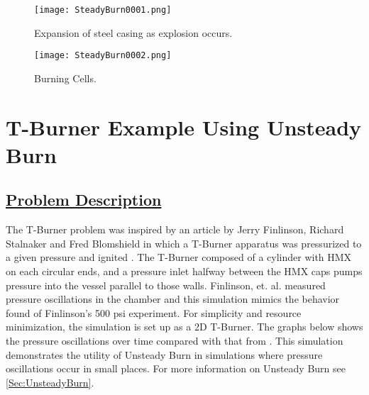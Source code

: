 \begin{figure}
  \center
  \texttt{[image: SteadyBurn0001.png]}

  \caption{Expansion of steel casing as explosion occurs.}
  \label{figsteadyburn2}
\end{figure}

\begin{figure}
  \center
  \texttt{[image: SteadyBurn0002.png]}

  \caption{Burning Cells.}
  \label{figsteadyburn3}
\end{figure}

\newpage
%
\newpage
\section*{\center  T-Burner Example Using Unsteady Burn}
\subsection*{\underline{Problem Description}}
The T-Burner problem was inspired by  an article by Jerry Finlinson, Richard Stalnaker and Fred Blomshield in which a T-Burner apparatus was pressurized to a given pressure and ignited \cite{ref:finlinson1}.  The T-Burner composed of a cylinder with HMX on each circular ends, and a pressure inlet halfway between the HMX caps pumps pressure into the vessel parallel to those walls.  Finlinson, et. al. measured pressure oscillations in the chamber and this simulation mimics the behavior found of Finlinson's 500 psi experiment.  For simplicity and resource minimization, the simulation is set up as a 2D T-Burner.  The graphs below shows the pressure oscillations over time compared with that from \cite{ref:finlinson1}.  This simulation demonstrates the utility of Unsteady Burn in simulations where pressure oscillations occur in small places.  For more information on Unsteady Burn see \ref{Sec:UnsteadyBurn}.


